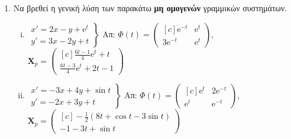 


\pagestyle{askhseis}



\begin{center}
  \minibox{\large \bfseries \textcolor{Col1}{Ασκήσεις στα Γραμμικά Συστήματα ΣΔΕ
  (Μη Ομογενή)}}
\end{center}

\vspace{\baselineskip}

\begin{enumerate} %
  \item Να βρεθεί η γενική λύση των παρακάτω \textbf{μη ομογενών} γραμμικών συστημάτων. 

    \begin{enumerate}[i)]
      \item $ 
        \left.
          \begin{matrix}
            x' = 2x-y+ \mathrm{e}^{t} \\
            y' = 3x-2y+t
          \end{matrix} 
        \right\} $
        \hfill Απ: $ \Phi(t) = 
        \begin{pmatrix*}[c]
          \mathrm{e}^{-t} & \mathrm{e}^{t} \\
          3 \mathrm{e}^{-t} & \mathrm{e}^{t}
        \end{pmatrix*} $, \; $ \mathbf{X}_{p} = 
        \begin{pmatrix*}[c] \frac{6t-1}{4} \mathrm{e}^{t} + t \\ \frac{6t-3}{4}
        \mathrm{e}^{t} +2t-1 \end{pmatrix*} $   

      \item $ 
        \left.
          \begin{matrix}
            x'=-3x+4y+ \sin{t} \\
            y'=-2x+3y+t
          \end{matrix} 
        \right\} $
        \hfill Απ: $ \Phi(t) = 
        \begin{pmatrix*}[c]
          \mathrm{e}^{t} & 2\mathrm{e}^{-t} \\
          \mathrm{e}^{t} & \mathrm{e}^{-t}
        \end{pmatrix*} $, \; $ \mathbf{X}_{p} = 
        \begin{pmatrix*}[c] 
          - \frac{1}{2} (8t+ \cos{t} -3 \sin{t}) \\ -1-3t+ \sin{t}
        \end{pmatrix*} $   


\end{enumerate}
\end{enumerate}
